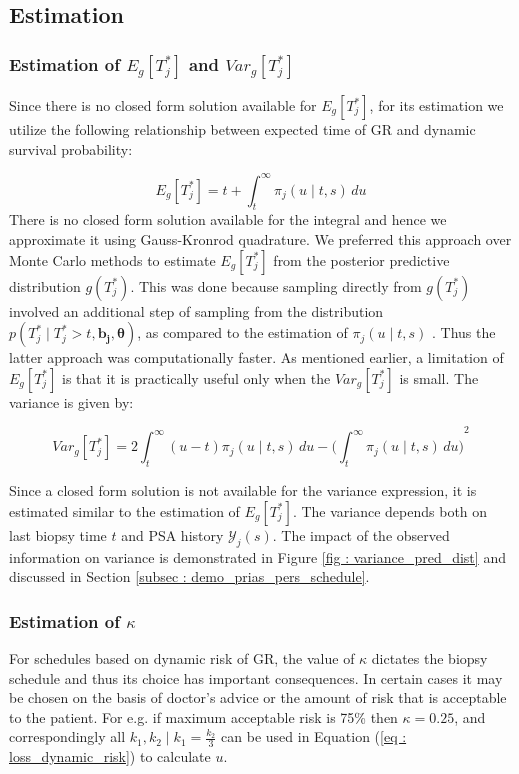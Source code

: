 \subsection{Estimation}
\subsubsection{Estimation of $E_g[T^*_j]$ and $Var_g[T^*_j]$}
Since there is no closed form solution available for $E_g[T^*_j]$, for its estimation we utilize the following relationship between expected time of GR and dynamic survival probability:

\begin{equation}
\label{eq : expected_time_survprob}
E_g[T^*_j] = t + \int_t^\infty \pi_j(u \mid t, s) \,du
\end{equation}
There is no closed form solution available for the integral and hence we approximate it using Gauss-Kronrod quadrature. We preferred this approach over Monte Carlo methods to estimate $E_g[T^*_j]$ from the posterior predictive distribution $g(T^*_j)$. This was done because sampling directly from $g(T^*_j)$ involved an additional step of sampling from the distribution $p(T^*_j \mid T^*_j > t, \boldsymbol{b_j}, \boldsymbol{\theta})$, as compared to the estimation of $\pi_j(u \mid t, s)$ \citep{rizopoulos2011dynamic}. Thus the latter approach was computationally faster. As mentioned earlier, a limitation of $E_g[T^*_j]$ is that it is practically useful only when the $Var_g[T^*_j]$ is small. The variance is given by:

\begin{equation}
\label{eq : var_time_survprob}
Var_g[T^*_j] = 2 \int_t^\infty {(u-t) \pi_j(u \mid t, s) \,du} - {\bigg(\int_t^\infty \pi_j(u \mid t, s) \,du\bigg)}^2
\end{equation}

Since a closed form solution is not available for the variance expression, it is estimated similar to the estimation of $E_g[T^*_j]$. The variance depends both on last biopsy time $t$ and PSA history $\mathcal{Y}_j(s)$. The impact of the observed information on variance is demonstrated in Figure \ref{fig : variance_pred_dist} and discussed in Section \ref{subsec : demo_prias_pers_schedule}.

\subsubsection{Estimation of $\kappa$}
\label{subsubsec : kappa_estimation}
For schedules based on dynamic risk of GR, the value of $\kappa$ dictates the biopsy schedule and thus its choice has important consequences. In certain cases it may be chosen on the basis of doctor's advice or the amount of risk that is acceptable to the patient. For e.g. if maximum acceptable risk is 75\% then $\kappa = 0.25$, and correspondingly all $k_1, k_2 \mid k_1=\frac{k_2}{3}$ can be used in Equation (\ref{eq : loss_dynamic_risk}) to calculate $u$.\\

